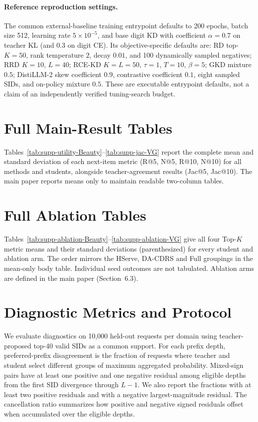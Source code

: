\documentclass[sigconf, anonymous, review]{acmart}
\begin{document}
\paragraph{Reference reproduction settings.}
The common external-baseline training entrypoint defaults to 200
epochs, batch size 512, learning rate $5\times10^{-5}$, and
base digit KD with coefficient $\alpha=0.7$ on teacher KL
(and $0.3$ on digit CE). Its objective-specific defaults are:
RD top-$K=50$, rank temperature $2$, decay $0.01$,
and 100 dynamically sampled negatives;
RRD $K=10$, $L=40$; RCE-KD $K=L=50$,
$\tau=1$, $T=10$, $\beta=5$; GKD mixture $0.5$;
DistiLLM-2 skew coefficient $0.9$, contrastive coefficient
$0.1$, eight sampled SIDs, and on-policy mixture $0.5$.
These are executable entrypoint defaults, not a claim of
an independently verified tuning-search budget.

\section{Full Main-Result Tables}
\label{sec:sup-main}

Tables~\ref{tab:supp-utility-Beauty}--\ref{tab:supp-jac-VG} report
the complete mean and standard deviation of each next-item metric
(R@5, N@5, R@10, N@10) for all methods and students, alongside
teacher-agreement results (Jac@5, Jac@10). The main paper reports
means only to maintain readable two-column tables.



\section{Full Ablation Tables}
\label{sec:sup-ablation}

Tables~\ref{tab:supp-ablation-Beauty}--\ref{tab:supp-ablation-VG} give
all four Top-$K$ metric means and their standard deviations
(parenthesized) for every student and ablation arm. The order mirrors
the HServe, DA-CDRS and Full groupings in the mean-only body table.
Individual seed outcomes are not tabulated. Ablation arms are defined
in the main paper (Section~6.3).



\section{Diagnostic Metrics and Protocol}
\label{sec:sup-diagnostics}

We evaluate diagnostics on 10,000 held-out requests per domain
using teacher-proposed top-40 valid SIDs as a common support.
For each prefix depth, preferred-prefix disagreement is the fraction
of requests where teacher and student select different groups of
maximum aggregated probability. Mixed-sign pairs have at least one
positive and one negative residual among eligible depths from the
first SID divergence through $L-1$. We also report the fractions with
at least two positive residuals and with a negative largest-magnitude
residual. The cancellation ratio summarizes how positive and negative
signed residuals offset when accumulated over the eligible depths.
\end{document}
